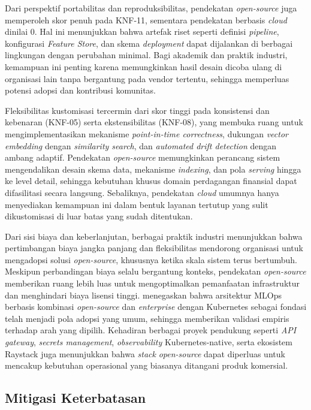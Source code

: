 Dari perspektif portabilitas dan reproduksibilitas, pendekatan \textit{open-source} juga memperoleh skor penuh pada KNF-11, sementara pendekatan berbasis \textit{cloud} dinilai 0. Hal ini menunjukkan bahwa artefak riset seperti definisi \textit{pipeline}, konfigurasi \textit{Feature Store}, dan skema \textit{deployment} dapat dijalankan di berbagai lingkungan dengan perubahan minimal. Bagi akademik dan praktik industri, kemampuan ini penting karena memungkinkan hasil desain dicoba ulang di organisasi lain tanpa bergantung pada vendor tertentu, sehingga memperluas potensi adopsi dan kontribusi komunitas.

Fleksibilitas kustomisasi tercermin dari skor tinggi pada konsistensi dan kebenaran (KNF-05) serta ekstensibilitas (KNF-08), yang membuka ruang untuk mengimplementasikan mekanisme \textit{point-in-time correctness}, dukungan \textit{vector embedding} dengan \textit{similarity search}, dan \textit{automated drift detection} dengan ambang adaptif. Pendekatan \textit{open-source} memungkinkan perancang sistem mengendalikan desain skema data, mekanisme \textit{indexing}, dan pola \textit{serving} hingga ke level detail, sehingga kebutuhan khusus domain perdagangan finansial dapat difasilitasi secara langsung. Sebaliknya, pendekatan \textit{cloud} umumnya hanya menyediakan kemampuan ini dalam bentuk layanan tertutup yang sulit dikustomisasi di luar batas yang sudah ditentukan.

Dari sisi biaya dan keberlanjutan, berbagai praktik industri menunjukkan bahwa pertimbangan biaya jangka panjang dan fleksibilitas mendorong organisasi untuk mengadopsi solusi \textit{open-source}, khususnya ketika skala sistem terus bertumbuh. Meskipun perbandingan biaya selalu bergantung konteks, pendekatan \textit{open-source} memberikan ruang lebih luas untuk mengoptimalkan pemanfaatan infrastruktur dan menghindari biaya lisensi tinggi. \textcite{kreuzberger2023mlops} menegaskan bahwa arsitektur MLOps berbasis kombinasi \textit{open-source} dan \textit{enterprise} dengan Kubernetes sebagai fondasi telah menjadi pola adopsi yang umum, sehingga memberikan validasi empiris terhadap arah yang dipilih. Kehadiran berbagai proyek pendukung seperti \textit{API gateway}, \textit{secrets management}, \textit{observability} Kubernetes-native, serta ekosistem Raystack juga menunjukkan bahwa \textit{stack} \textit{open-source} dapat diperluas untuk mencakup kebutuhan operasional yang biasanya ditangani produk komersial.

\subsection{Mitigasi Keterbatasan}

